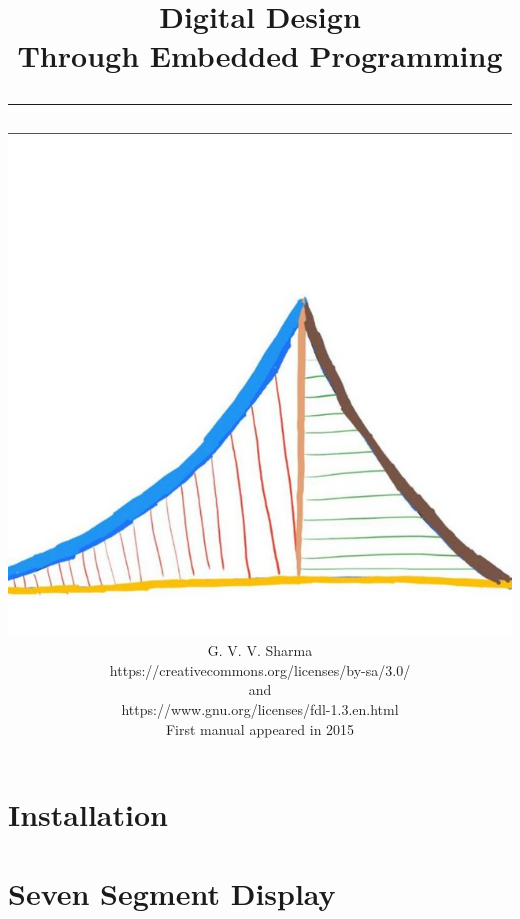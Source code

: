 \documentclass[journal]{IEEEtran}
\begin{document}

\onecolumn


\title{
	\begin{flushleft}
Digital Design \\ {Through Embedded Programming}
	\\
\rule{0.4\columnwidth}{0.4pt}
\end{flushleft}
}
\author{
\vspace{7cm}
	\begin{flushleft}
\includegraphics[width=0.2\columnwidth]{figs/logo.jpg}
\\
		{	\huge G. V. V. Sharma}
		\\
\vspace{1cm}
https://creativecommons.org/licenses/by-sa/3.0/
\\
and
\\
https://www.gnu.org/licenses/fdl-1.3.en.html
\\
First manual appeared in 2015
	\end{flushleft}
}
\maketitle

\newpage


\tableofcontents

\newpage
\twocolumn

\section{Installation}

\newpage
\section{Seven Segment Display}

\newpage
\end{document}
